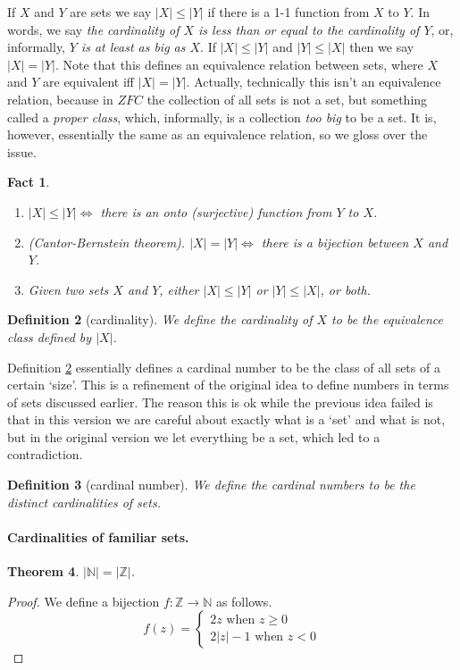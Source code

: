 \documentclass{article}
\theoremstyle{plain}
\newtheorem{theorem}{Theorem}[section]{\bfseries}{\itshape}
\newtheorem{definition}[theorem]{Definition}{\bfseries}{\upshape}
\newtheorem{fact}[theorem]{Fact}{\bfseries}{\upshape}
\newcommand{\bN}{\mathbb{N}}
\newcommand{\bZ}{\mathbb{Z}}
\begin{document}
If $X$ and $Y$ are sets we say $|X|\leq |Y|$ if there is a 1-1 function from $X$ to $Y$. In words, we say \emph{the cardinality of $X$ is less than or equal to the cardinality of $Y$}, or, informally, \emph{$Y$ is at least as big as $X$}. If $|X|\leq |Y|$ and $|Y|\leq|X|$ then we say $|X|=|Y|$. Note that this defines an equivalence relation between  sets, where $X$ and $Y$ are equivalent iff $|X|=|Y|$. Actually, technically this isn't an equivalence relation, because in $ZFC$ the collection of all sets is not a set, but something called a \emph{proper class}, which, informally, is a collection \emph{too big} to be a set. It is, however, essentially the same as an equivalence relation, so we gloss over the issue. 

\begin{fact}\label{Fa:card}\mbox{}
\begin{enumerate}
\item $|X|\leq|Y|\iff$ there is an onto (surjective) function from $Y$ to $X$.
\item (Cantor-Bernstein theorem). $|X|=|Y|\iff$ there is a bijection between $X$ and $Y$.
\item Given two sets $X$ and $Y$, either $|X|\leq |Y|$ or $|Y|\leq|X|$, or both.
\end{enumerate}
\end{fact}

\begin{definition}[cardinality]\label{D:card}
We define the \emph{cardinality} of $X$ to be the equivalence class defined by $|X|$.
\end{definition}
Definition \ref{D:card} essentially defines a cardinal number to be the class of all sets of a certain `size'. This is a refinement of the original idea to define numbers in terms of sets discussed earlier. The reason this is ok while the previous idea failed is that in this version we are careful about exactly what is a `set' and what is not, but in the original version we let everything be a set, which led to a contradiction. 

\begin{definition}[cardinal number]
We define the \emph{cardinal numbers} to be the distinct cardinalities of sets.
\end{definition}

\paragraph{Cardinalities of familiar sets.}
\begin{theorem}\label{T:Z}
$|\bN|=|\bZ|$.
\end{theorem}
\begin{proof}
We define a bijection $f:\bZ\to\bN$ as follows.
\[f(z)=\begin{cases}2z \text{ when $z\geq 0$} \\
2|z| - 1 \text{ when $z<0$} \end{cases}\]
\end{proof}
\end{document}
